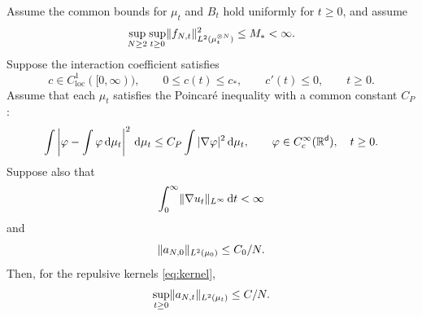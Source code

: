 \documentclass[11pt,reqno]{amsart}
\numberwithin{equation}{section}
\theoremstyle{plain}
\theoremstyle{remark}
\DeclarePairedDelimiter{\norm}{\lVert}{\rVert}
\renewcommand{\d}{\mathsf{d}}\newcommand{\s}{\mathsf{s}}
\begin{document}
\begin{prop}\label{prop:uniform-mark}
Assume the common bounds for $\mu_t$ and $B_t$ hold uniformly for $t\ge0$, and assume
\begin{equation}\label{eq:uniform-mark-moment}
 \sup_{N\ge2}\sup_{t\ge0}\norm{f_{N,t}}_{L^2(\mu_t^{\otimes N})}^2\le M_*<\infty.
\end{equation}
Suppose the interaction coefficient satisfies
\begin{equation}\label{eq:uniform-mark-coupling}
 c\in C_{\mathrm{loc}}^1([0,\infty)),\qquad 0\le c(t)\le c_*,\qquad c'(t)\le0,
 \qquad t\ge0.
\end{equation}
Assume that each $\mu_t$ satisfies the Poincar\'e inequality with a common constant $C_P$:
\begin{equation}\label{eq:uniform-mark-poincare}
 \int\left|\varphi-\int\varphi\dd\mu_t\right|^2\dd\mu_t
 \le C_P\int|\nabla\varphi|^2\dd\mu_t,
 \qquad \varphi\in C_c^\infty(\R^\d),\quad t\ge0.
\end{equation}
Suppose also that
\begin{equation}\label{eq:integrable-velocity}
 \int_0^\infty\norm{\nabla u_t}_{L^\infty}\dd t<\infty
\end{equation}
and
\begin{equation}\label{eq:uniform-mark-initial}
 \norm{a_{N,0}}_{L^2(\mu_0)}\le C_0/N.
\end{equation}
Then, for the repulsive kernels \eqref{eq:kernel},
\begin{equation}\label{eq:uniform-mark}
 \sup_{t\ge0}\norm{a_{N,t}}_{L^2(\mu_t)}\le C/N.
\end{equation}
\end{prop}
\end{document}
